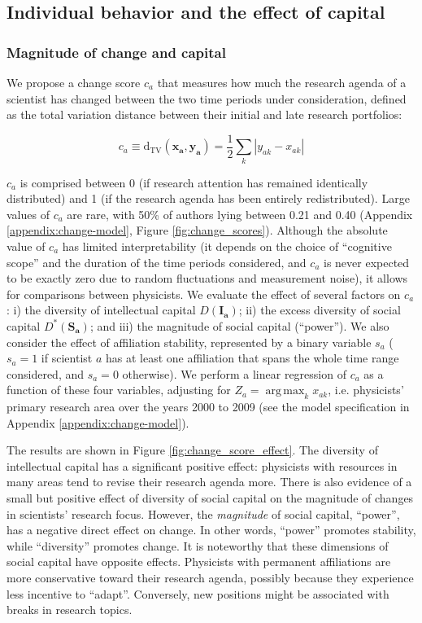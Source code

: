 \documentclass{article}
\DeclareMathOperator*{\argmax}{arg\,max}
\begin{document}
\subsection{\label{sec:comparative}Individual behavior and the effect of capital}

\subsubsection{Magnitude of change and capital}

We propose a change score $c_a$ that measures how much the research agenda of a scientist has changed between the two time periods under consideration, defined as the total variation distance between their initial and late research portfolios:

\begin{equation}
    c_a \equiv \mathrm{d}_{\text{TV}}(\bm{x_a},\bm{y_a}) = \frac{1}{2} \sum_k |y_{ak}-x_{ak}|
\end{equation}

$c_a$ is comprised between 0 (if research attention has remained identically distributed) and 1 (if the research agenda has been entirely redistributed). Large values of $c_a$ are rare, with 50\% of authors lying between 0.21 and 0.40  (Appendix \ref{appendix:change-model}, Figure \ref{fig:change_scores}). Although the absolute value of $c_a$ has limited interpretability (it depends on the choice of ``cognitive scope''   and the duration of the time periods considered, and $c_a$ is never expected to be exactly zero due to random fluctuations and measurement noise), it allows for comparisons between physicists. We evaluate the effect of several factors on $c_a$: i) the diversity of intellectual capital $D(\bm{I_a})$; ii) the excess diversity of social capital $D^{\ast}(\bm{S_a})$; and iii) the magnitude of social capital (``power''). We also consider the effect of affiliation stability, represented by a binary variable $s_a$ ($s_a=1$ if scientist $a$ has at least one affiliation that spans the whole time range considered, and $s_a=0$ otherwise). We perform a linear regression of $c_a$ as a function of these four variables, adjusting for $Z_a=\argmax_{k} x_{ak}$, i.e. physicists' primary research area over the years 2000 to 2009 (see the model specification in Appendix \ref{appendix:change-model}).

The results are shown in Figure \ref{fig:change_score_effect}. The diversity of intellectual capital has a significant positive effect: physicists with resources in many areas tend to revise their research agenda more. There is also evidence of a small but positive effect of diversity of social capital on the magnitude of changes in scientists' research focus. However, the \textit{magnitude} of social capital, ``power'', has a negative direct effect on change. In other words, ``power'' promotes stability, while ``diversity'' promotes change. It is noteworthy that these dimensions of social capital have opposite effects. Physicists with permanent affiliations are more conservative toward their research agenda, possibly because they experience less incentive to ``adapt''. Conversely, new positions might be associated with breaks in research topics.
\end{document}
